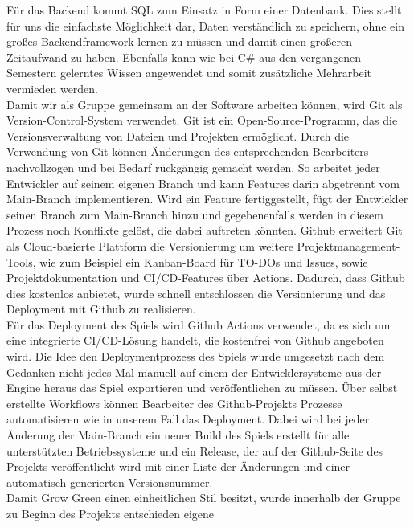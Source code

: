 \newline
Für das Backend kommt SQL zum Einsatz in Form einer Datenbank.
Dies stellt für uns die einfachste Möglichkeit dar, Daten verständlich zu speichern, ohne ein großes Backendframework
lernen zu müssen und damit einen größeren Zeitaufwand zu haben. 
Ebenfalls kann wie bei C\# aus den vergangenen Semestern gelerntes Wissen angewendet und somit zusätzliche 
Mehrarbeit vermieden werden. \\
\newpage
Damit wir als Gruppe gemeinsam an der Software arbeiten können, wird Git als Version-Control-System verwendet.
Git ist ein Open-Source-Programm, das die Versionsverwaltung von Dateien und Projekten ermöglicht.
Durch die Verwendung von Git können Änderungen des entsprechenden Bearbeiters nachvollzogen und bei Bedarf rückgängig 
gemacht werden.
So arbeitet jeder Entwickler auf seinem eigenen Branch und kann Features darin abgetrennt vom Main-Branch 
implementieren.
Wird ein Feature fertiggestellt, fügt der Entwickler seinen Branch zum Main-Branch hinzu und gegebenenfalls werden
in diesem Prozess noch Konflikte gelöst, die dabei auftreten könnten.
Github erweitert Git als Cloud-basierte Plattform die Versionierung um weitere Projektmanagement-Tools, wie zum
Beispiel ein Kanban-Board für TO-DOs und Issues, sowie Projektdokumentation und CI/CD-Features über Actions. 
Dadurch, dass Github dies kostenlos anbietet, wurde schnell entschlossen die Versionierung und das Deployment mit Github
zu realisieren.\\
\newline
Für das Deployment des Spiels wird Github Actions verwendet, da es sich um eine integrierte CI/CD-Lösung handelt, die
kostenfrei von Github angeboten wird.
Die Idee den Deploymentprozess des Spiels wurde umgesetzt nach dem Gedanken nicht jedes Mal manuell auf einem der 
Entwicklersysteme aus der Engine heraus das Spiel exportieren und veröffentlichen zu müssen.
Über selbst erstellte Workflows können Bearbeiter des Github-Projekts Prozesse automatisieren wie in unserem Fall das
Deployment. 
Dabei wird bei jeder Änderung der Main-Branch ein neuer Build des Spiels erstellt für alle unterstützten 
Betriebssysteme und ein Release, der auf der Github-Seite des Projekts veröffentlicht wird mit einer Liste der 
Änderungen und einer automatisch generierten Versionsnummer.\\
\newline
Damit Grow Green einen einheitlichen Stil besitzt, wurde innerhalb der Gruppe zu Beginn des Projekts entschieden eigene
